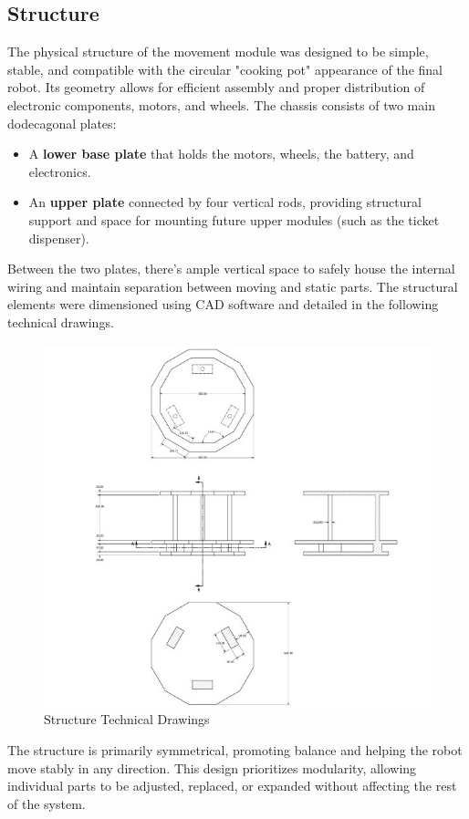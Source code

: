 \subsection{Structure}

The physical structure of the movement module was designed to be simple, stable, and compatible with the circular "cooking pot" appearance of the final robot. Its geometry allows for efficient assembly and proper distribution of electronic components, motors, and wheels. The chassis consists of two main dodecagonal plates:

\begin{itemize}
    \item A \textbf{lower base plate} that holds the motors, wheels, the battery, and electronics.
    \item An \textbf{upper plate} connected by four vertical rods, providing structural support and space for mounting future upper modules (such as the ticket dispenser).
\end{itemize}

Between the two plates, there's ample vertical space to safely house the internal wiring and maintain separation between moving and static parts. The structural elements were dimensioned using CAD software and detailed in the following technical drawings.

\begin{figure}[H]
    \centering
    \includegraphics[width=0.7\linewidth]{../ReportMovementModule/images/Aspose.Words.728084da-df58-4b9d-a372-f65cffbdb23d.008.jpeg}
    \caption{Structure Technical Drawings}
\end{figure}

The structure is primarily symmetrical, promoting balance and helping the robot move stably in any direction. This design prioritizes modularity, allowing individual parts to be adjusted, replaced, or expanded without affecting the rest of the system.
